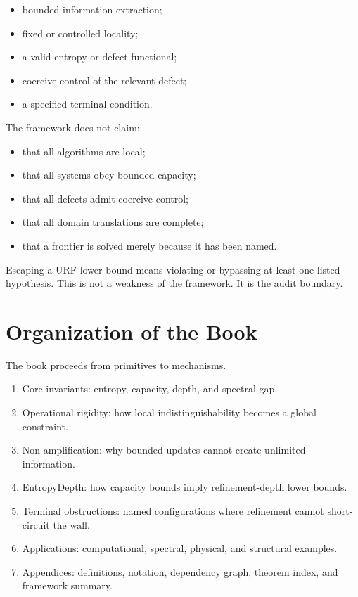 \begin{itemize}
\item bounded information extraction;
\item fixed or controlled locality;
\item a valid entropy or defect functional;
\item coercive control of the relevant defect;
\item a specified terminal condition.
\end{itemize}

The framework does not claim:

\begin{itemize}
\item that all algorithms are local;
\item that all systems obey bounded capacity;
\item that all defects admit coercive control;
\item that all domain translations are complete;
\item that a frontier is solved merely because it has been named.
\end{itemize}

Escaping a URF lower bound means violating or bypassing at least one listed
hypothesis. This is not a weakness of the framework. It is the audit boundary.

\section{Organization of the Book}

The book proceeds from primitives to mechanisms.

\begin{enumerate}
\item Core invariants: entropy, capacity, depth, and spectral gap.
\item Operational rigidity: how local indistinguishability becomes a global
constraint.
\item Non-amplification: why bounded updates cannot create unlimited
information.
\item EntropyDepth: how capacity bounds imply refinement-depth lower bounds.
\item Terminal obstructions: named configurations where refinement cannot
short-circuit the wall.
\item Applications: computational, spectral, physical, and structural examples.
\item Appendices: definitions, notation, dependency graph, theorem index, and
framework summary.
\end{enumerate}

